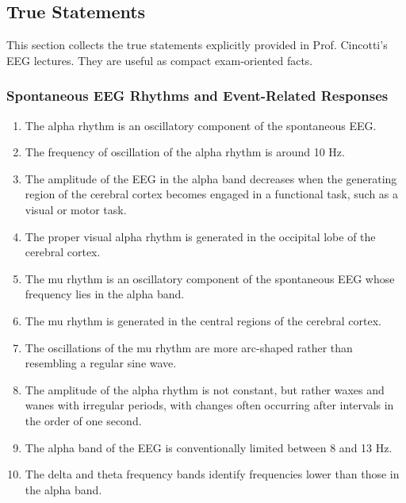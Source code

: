 \subsection{True Statements}

This section collects the true statements explicitly provided in Prof. Cincotti's EEG lectures. They are useful as compact exam-oriented facts.

\subsubsection{Spontaneous EEG Rhythms and Event-Related Responses}

\begin{enumerate}[label=\arabic*.]
    \item The alpha rhythm is an oscillatory component of the spontaneous EEG.
    
    \item The frequency of oscillation of the alpha rhythm is around 10 Hz.
    
    \item The amplitude of the EEG in the alpha band decreases when the generating region of the cerebral cortex becomes engaged in a functional task, such as a visual or motor task.
    
    \item The proper visual alpha rhythm is generated in the occipital lobe of the cerebral cortex.
    
    \item The mu rhythm is an oscillatory component of the spontaneous EEG whose frequency lies in the alpha band.
    
    \item The mu rhythm is generated in the central regions of the cerebral cortex.
    
    \item The oscillations of the mu rhythm are more arc-shaped rather than resembling a regular sine wave.
    
    \item The amplitude of the alpha rhythm is not constant, but rather waxes and wanes with irregular periods, with changes often occurring after intervals in the order of one second.
    
    \item The alpha band of the EEG is conventionally limited between 8 and 13 Hz.
    
    \item The delta and theta frequency bands identify frequencies lower than those in the alpha band.
    

\end{enumerate}
